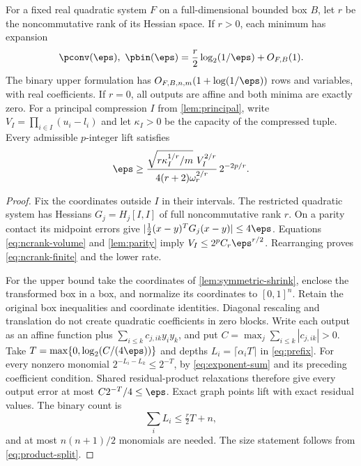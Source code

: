 \begin{theorem}\label{thm:ncrank}
For a fixed real quadratic system $F$ on a full-dimensional bounded
box $B$, let $r$ be the noncommutative rank of its Hessian space.
If $r>0$, each minimum has expansion
\begin{equation}\label{eq:ncrank-law}
 \pconv(\eps),\ \pbin(\eps)
   =\frac r2\log_2(1/\eps)+O_{F,B}(1).
\end{equation}
The binary upper formulation has
$O_{F,B,n,m}(1+\log(1/\eps))$ rows and variables, with real coefficients.
If $r=0$, all outputs are affine and both minima are exactly zero.
For a principal compression $I$ from \cref{lem:principal}, write
$V_I=\prod_{i\in I}(u_i-l_i)$ and let $\kappa_I>0$ be the capacity of
the compressed tuple. Every admissible $p$-integer lift satisfies
\begin{equation}\label{eq:ncrank-finite}
 \eps\ge
 \frac{\sqrt{r\kappa_I^{1/r}/m}\ V_I^{2/r}}
      {4(r+2)\omega_r^{2/r}}\,2^{-2p/r}.
\end{equation}
\end{theorem}
\begin{proof}
Fix the coordinates outside $I$ in their intervals. The restricted
quadratic system has Hessians $G_j=H_j[I,I]$ of full noncommutative
rank $r$. On a parity contact its midpoint errors give
$|\tfrac12(x-y)^TG_j(x-y)|\le4\eps$. Equations
\eqref{eq:ncrank-volume} and \cref{lem:parity} imply
$V_I\le2^pC_r\eps^{r/2}$. Rearranging proves
\eqref{eq:ncrank-finite} and the lower rate.

For the upper bound take the coordinates of
\cref{lem:symmetric-shrink}, enclose the transformed box in a box,
and normalize its coordinates to $[0,1]^n$. Retain the original box
inequalities and coordinate identities. Diagonal rescaling and
translation do not create quadratic coefficients in zero blocks.
Write each output as an affine function plus
$\sum_{i\le k}c_{j,ik}y_iy_k$, and put
$C=\max_j\sum_{i\le k}|c_{j,ik}|>0$.
Take $T=\max\{0,\log_2(C/(4\eps))\}$ and depths
$L_i=\lceil\alpha_iT\rceil$ in \eqref{eq:prefix}. For every nonzero
monomial $2^{-L_i-L_k}\le2^{-T}$, by \eqref{eq:exponent-sum} and its
preceding coefficient condition. Shared residual-product relaxations
therefore give every output error at most $C2^{-T}/4\le\eps$.
Exact graph points lift with exact residual values. The binary count is
\[
 \sum_iL_i\le\tfrac r2T+n,
\]
and at most $n(n+1)/2$ monomials are needed. The size statement follows
from \eqref{eq:product-split}.
\end{proof}

